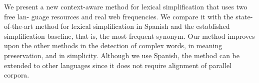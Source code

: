We present a new context-aware method for lexical simplification that uses two free lan- guage resources and real web frequencies. We compare it with the state-of-the-art method for lexical simplification in Spanish and the established simplification baseline, that is, the most frequent synonym. Our method improves upon the other methods in the detection of complex words, in meaning preservation, and in simplicity. Although we use Spanish, the method can be extended to other languages since it does not require alignment of parallel corpora.
